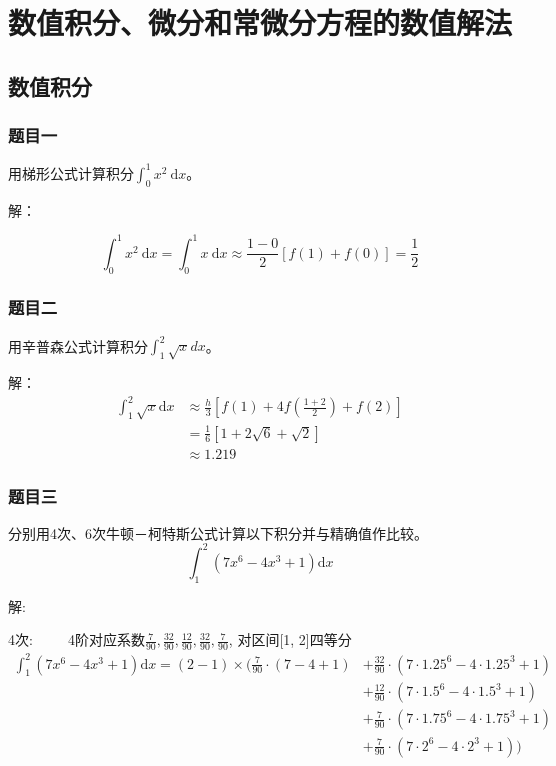 \documentclass[UTF8]{ctexart}
\begin{document}
\newpage

\section{数值积分、微分和常微分方程的数值解法}
\subsection{数值积分}
\subsubsection{题目一}
用梯形公式计算积分$\int_{0}^{1} x^{2} \mathrm{~d} x$。

解：

$$
\int_{0}^{1} x^{2} \mathrm{~d} x = \int_{0}^{1} x\mathrm{~d} x \approx\frac{1-0}{2}[f(1)+f(0)]
=\frac{1}{2}
$$


\subsubsection{题目二}
用辛普森公式计算积分$\int_{1}^{2} \sqrt{x} d x$。

解：
\begin{equation}\nonumber
    \begin{split}
        \int_{1}^{2} \sqrt{x} \mathrm{d} x & \approx \frac{h}{3}\left[f(1)+4 f\left(\frac{1+2}{2}\right)+f(2)\right]
        \\ &= \frac{1}{6}\left[1+2\sqrt{6}+\sqrt{2}\right]
        \\ & \approx 1.219
    \end{split}
\end{equation}
\subsubsection{题目三}
分别用4次、6次牛顿－柯特斯公式计算以下积分并与精确值作比较。
$$
\int_{1}^{2}\left(7 x^{6}-4 x^{3}+1\right) \mathrm{d} x
$$

解:

4次:~~~~~4阶对应系数$\frac{7}{90}, \frac{32}{90}, \frac{12}{90}, \frac{32}{90}, 
\frac{7}{90}$, 对区间[1, 2]四等分
\begin{equation}\nonumber
    \begin{split}
        \int_{1}^{2}\left(7 x^{6}-4 x^{3}+1\right) \mathrm{d} x = (2 - 1) \times (\frac{7}{90}\cdot(7-4+1) & +\frac{32}{90}\cdot(7\cdot{1.25}^6-4\cdot{1.25}^3+1)
        \\&+\frac{12}{90}\cdot(7\cdot{1.5}^6-4\cdot{1.5}^3+1)
        \\&+\frac{7}{90}\cdot(7\cdot{1.75}^6-4\cdot{1.75}^3+1)
        \\&+\frac{7}{90}\cdot(7\cdot{2}^6-4\cdot{2}^3+1))
    \end{split}
\end{equation}
\end{document}
